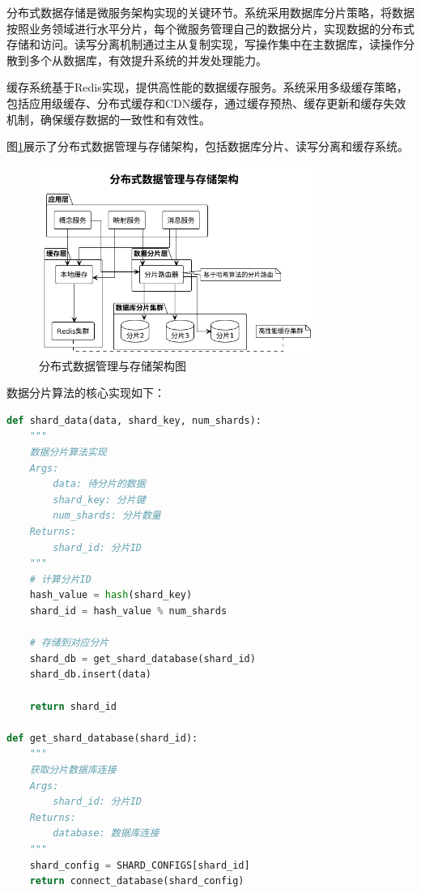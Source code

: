 分布式数据存储是微服务架构实现的关键环节。系统采用数据库分片策略，将数据按照业务领域进行水平分片，每个微服务管理自己的数据分片，实现数据的分布式存储和访问。读写分离机制通过主从复制实现，写操作集中在主数据库，读操作分散到多个从数据库，有效提升系统的并发处理能力。

缓存系统基于Redis实现，提供高性能的数据缓存服务。系统采用多级缓存策略，包括应用级缓存、分布式缓存和CDN缓存，通过缓存预热、缓存更新和缓存失效机制，确保缓存数据的一致性和有效性。

图\ref{fig:data_management}展示了分布式数据管理与存储架构，包括数据库分片、读写分离和缓存系统。

\begin{figure}[H]
    \centering
    \includegraphics[width=0.8\textwidth]{chapters/fig-0/data_management.png}
    \caption{分布式数据管理与存储架构图}
    \label{fig:data_management}
\end{figure}

数据分片算法的核心实现如下：

\begin{lstlisting}[language=Python, label=fig:data_sharding]
def shard_data(data, shard_key, num_shards):
    """
    数据分片算法实现
    Args:
        data: 待分片的数据
        shard_key: 分片键
        num_shards: 分片数量
    Returns:
        shard_id: 分片ID
    """
    # 计算分片ID
    hash_value = hash(shard_key)
    shard_id = hash_value % num_shards
    
    # 存储到对应分片
    shard_db = get_shard_database(shard_id)
    shard_db.insert(data)
    
    return shard_id

def get_shard_database(shard_id):
    """
    获取分片数据库连接
    Args:
        shard_id: 分片ID
    Returns:
        database: 数据库连接
    """
    shard_config = SHARD_CONFIGS[shard_id]
    return connect_database(shard_config)
\end{lstlisting}

